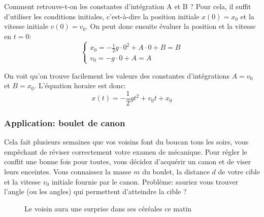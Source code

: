 \documentclass{article}
\begin{document}
\indent Comment retrouve-t-on les constantes d'intégration A et B ? Pour cela, il suffit d'utiliser les conditions initiales, c'est-à-dire la position initiale $x(0) = x_0$ et la vitesse initiale $v(0) = v_0$. On peut donc ensuite évaluer la position et la vitesse en $t=0$: 
\begin{equation*}
    \begin{cases}
    x_0 = -\frac{1}{2}g \cdot 0^2 + A \cdot 0 + B = B\\
    v_0 = -g \cdot 0 + A = A
    \end{cases}
\end{equation*}

On voit qu'on trouve facilement les valeurs des constantes d'intégrations $A = v_0$ et $B = x_0$. L'équation horaire est donc:
\[ x(t) = -\frac{1}{2}gt^2 + v_0 t + x_0 \]

\subsubsection{Application: boulet de canon}
\begin{tcolorbox}[title=Enoncé]
Cela fait plusieurs semaines que vos voisins font du boucan tous les soirs, vous empêchant de réviser correctement votre examen de mécanique. Pour régler le conflit une bonne fois pour toutes, vous décidez d'acquérir un canon et de viser leurs enceintes. Vous connaissez la masse $m$ du boulet, la distance $d$ de votre cible et la vitesse $v_0$ initiale fournie par le canon. Problème: sauriez vous trouver l'angle (ou les angles) qui permettent d'atteindre la cible ?
\end{tcolorbox}

\begin{figure}[H]
    \centering
    

    \caption{Le voisin aura une surprise dans ses céréales ce matin}
    \label{fig:boulet}
\end{figure}
\end{document}
